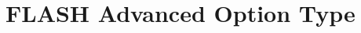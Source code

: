 \hypertarget{group___f_l_a_s_h_ex___advanced___option___type}{}\section{F\+L\+A\+SH Advanced Option Type}
\label{group___f_l_a_s_h_ex___advanced___option___type}
